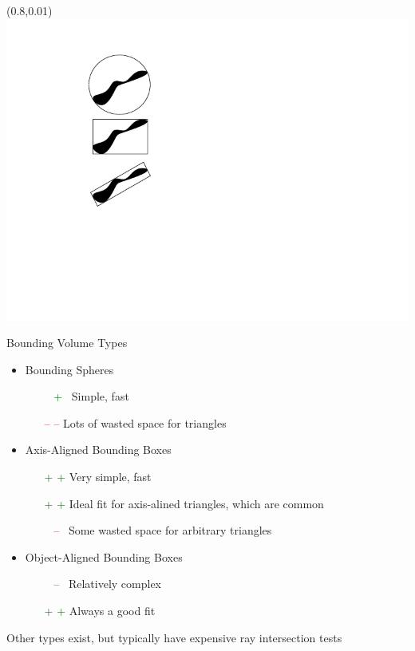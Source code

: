 \documentclass[utf8,stillsansserifmath,fleqn,t]{beamer}
\begin{document}
\begin{frame}
\frametitle{\insertsection}
\begin{textblock}{0.18}(0.8,0.01) \includegraphics[width=\textwidth]{./fig/bv-types.pdf} \end{textblock}
Bounding Volume Types
\begin{itemize}
\item Bounding Spheres
    \begin{itemize}
    \item[\textcolor{DarkGreen}{~ + \,}] Simple, fast
    \item[\textcolor{DarkRed}{-- --}] Lots of wasted space for triangles
    \end{itemize}
\item Axis-Aligned Bounding Boxes
    \begin{itemize}
    \item[\textcolor{DarkGreen}{+ +}] Very simple, fast
    \item[\textcolor{DarkGreen}{+ +}] Ideal fit for axis-alined triangles, which are common
    \item[\textcolor{DarkRed}{~ -- \,}] Some wasted space for arbitrary triangles
    \end{itemize}
\item Object-Aligned Bounding Boxes
    \begin{itemize}
    \item[\textcolor{DarkRed}{~ -- \,}] Relatively complex
    \item[\textcolor{DarkGreen}{+ +}] Always a good fit
    \end{itemize}
\end{itemize}
Other types exist, but typically have expensive ray intersection tests
\end{frame}
\end{document}
